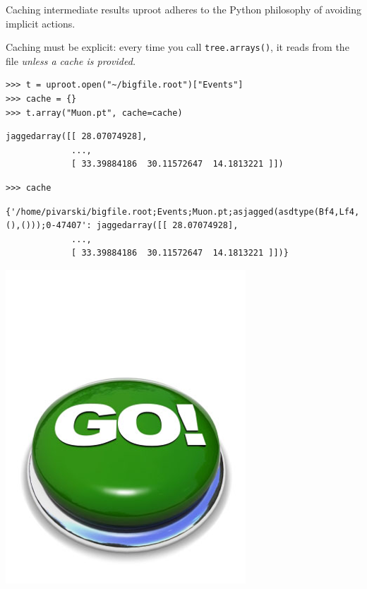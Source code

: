 \documentclass[aspectratio=169]{beamer}
\begin{document}
\begin{frame}[fragile]{Caching intermediate results}
\vspace{0.3 cm}
uproot adheres to the Python philosophy of avoiding implicit actions.

\vspace{0.2 cm}
Caching must be explicit: every time you call {\tt tree.arrays()}, it reads from the file {\it unless a cache is provided.}

\small
\vspace{0.2 cm}
\begin{verbatim}
>>> t = uproot.open("~/bigfile.root")["Events"]
>>> cache = {}
>>> t.array("Muon.pt", cache=cache)
\end{verbatim}
\begin{verbatim}
jaggedarray([[ 28.07074928],
             ...,
             [ 33.39884186  30.11572647  14.1813221 ]])
\end{verbatim}
\begin{verbatim}
>>> cache
\end{verbatim}
\begin{verbatim}
{'/home/pivarski/bigfile.root;Events;Muon.pt;asjagged(asdtype(Bf4,Lf4,
(),()));0-47407': jaggedarray([[ 28.07074928],
             ...,
             [ 33.39884186  30.11572647  14.1813221 ]])}
\end{verbatim}

\vspace{-6 cm}
\hfill \includegraphics[width=1.5 cm]{safe.png}\hspace{-0.9 cm}
\vspace{6 cm}
\end{frame}
\end{document}
